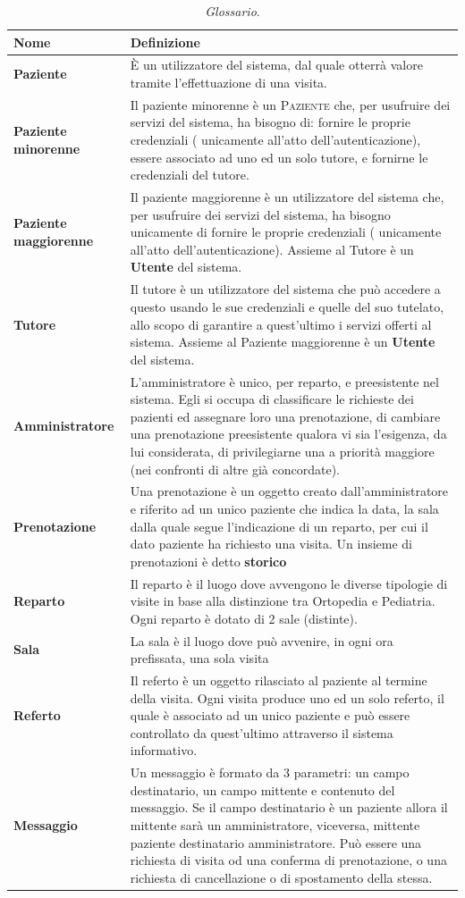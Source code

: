 \begin{table}[!t]
\begin{tabularx}{\columnwidth}{lX}
\toprule
Nome & Definizione\\
\midrule
\textbf{Paziente} & È un utilizzatore del sistema, dal quale otterrà valore tramite 
	l'effettuazione di una visita.\\
\textbf{Paziente minorenne} & Il paziente minorenne è un \textsc{Paziente} che, per 
	usufruire dei servizi del sistema, ha  bisogno di:
	fornire le proprie credenziali ( unicamente all'atto dell'autenticazione),
	essere associato ad uno ed un solo tutore, e
	fornirne le credenziali del tutore.
 	\\
\textbf{Paziente maggiorenne} & Il paziente maggiorenne è un utilizzatore del sistema 
	che, per usufruire dei servizi del sistema, ha bisogno unicamente di
	fornire le proprie credenziali ( unicamente all'atto dell'autenticazione).
	Assieme al Tutore è un \textbf{Utente} del sistema.\\
\textbf{Tutore} & Il tutore è un utilizzatore del sistema che può accedere a questo
	usando le sue credenziali e quelle del suo tutelato, allo scopo di
	garantire a quest'ultimo i servizi offerti al sistema. Assieme al Paziente
	maggiorenne è un \textbf{Utente} del sistema.\\
\textbf{Amministratore} & L'amministratore è unico, per reparto, e preesistente nel 
	sistema. Egli si occupa di classificare le richieste dei pazienti ed 
	assegnare loro una prenotazione, di cambiare una prenotazione preesistente 
	qualora vi sia l'esigenza, da lui considerata, di privilegiarne una
	a priorità maggiore (nei confronti di altre già concordate).\\
\textbf{Prenotazione} & Una prenotazione è un oggetto creato dall'amministratore e 
	riferito ad un unico paziente che indica la data, la sala dalla quale
	segue l'indicazione di un reparto, per cui il dato paziente ha richiesto 
	una visita. Un insieme di prenotazioni è detto \textbf{storico}\\
\textbf{Reparto} & Il reparto è il luogo dove avvengono le diverse tipologie di visite
	in base alla distinzione tra Ortopedia e Pediatria. Ogni reparto è dotato
	di 2 sale (distinte).\\
\textbf{Sala} & La sala è il luogo dove può avvenire, in ogni ora prefissata, una
	sola visita\\
\textbf{Referto} & Il referto è un oggetto rilasciato al paziente al termine della
	visita. Ogni visita produce uno ed un solo referto, il quale è associato 
	ad un unico paziente e può essere controllato da quest'ultimo attraverso 
	il sistema informativo.\\
\textbf{Messaggio} & Un messaggio è formato da 3 parametri: un campo destinatario,
un campo mittente e contenuto del messaggio.
Se il campo destinatario è un paziente allora il mittente sarà un amministratore, 
viceversa, mittente paziente destinatario amministratore.
Può essere una richiesta di visita od una conferma di prenotazione, o una richiesta
di cancellazione o di spostamento della stessa.
\end{tabularx}
\caption{\textit{Glossario}.}
\label{tab:gloss}
\end{table}

